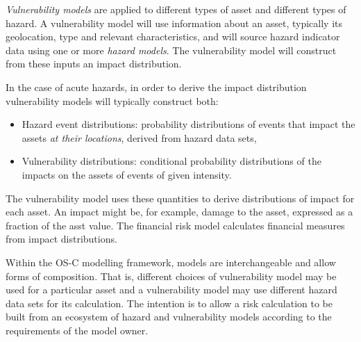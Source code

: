 \documentclass[a4paper,11pt]{extarticle} %
\theoremstyle{definition}
\begin{document}
\emph{Vulnerability models} are applied to different types of asset and different types of hazard. A vulnerability model will use information about an asset, typically its geolocation, type and relevant characteristics, and will source hazard indicator data using one or more \emph{hazard models}. The vulnerability model will construct from these inputs an impact distribution.

In the case of acute hazards, in order to derive the impact distribution vulnerability models will typically construct both:
\begin{itemize}
    \item Hazard event distributions: probability distributions of events that impact the assets \emph{at their locations}, derived from hazard data sets,
    \item Vulnerability distributions: conditional probability distributions of the impacts on the assets of events of given intensity.
\end{itemize}

The vulnerability model uses these quantities to derive distributions of impact for each asset. An impact might be, for example, damage to the asset, expressed as a fraction of the asst value. The financial risk model calculates financial measures from impact distributions.

Within the OS-C modelling framework, models are interchangeable and allow forms of composition. That is, different choices of vulnerability model may be used for a particular asset and a vulnerability model may use different hazard data sets for its calculation. The intention is to allow a risk calculation to be built from an ecosystem of hazard and vulnerability models according to the requirements of the model owner.
\end{document}
